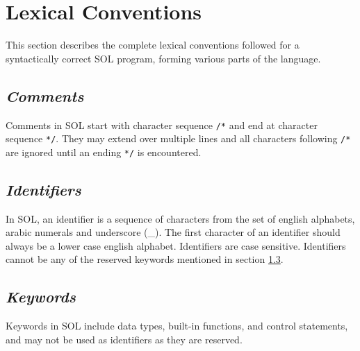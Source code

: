 \section{Lexical Conventions}

This section describes the complete lexical conventions followed for a syntactically correct SOL program, forming various parts of the language.

    \subsection{\textit{Comments}}
    Comments in SOL start with character sequence \texttt{/*} and end at character sequence \texttt{*/}. They may extend over multiple lines and all characters following \texttt{/*} are ignored until an ending \texttt{*/} is encountered.

    \subsection{\textit{Identifiers}}\label{identifer}
    In SOL, an identifier is a sequence of characters from the set of english alphabets, arabic numerals and underscore (\_). The first character of an identifier should always be a lower case english alphabet. Identifiers are case sensitive. Identifiers cannot be any of the reserved keywords mentioned in section \ref{keywords}.

    \subsection{\textit{Keywords}} \label{keywords}
    Keywords in SOL include data types, built-in functions, and control statements, and may not be used as identifiers as they are reserved.

